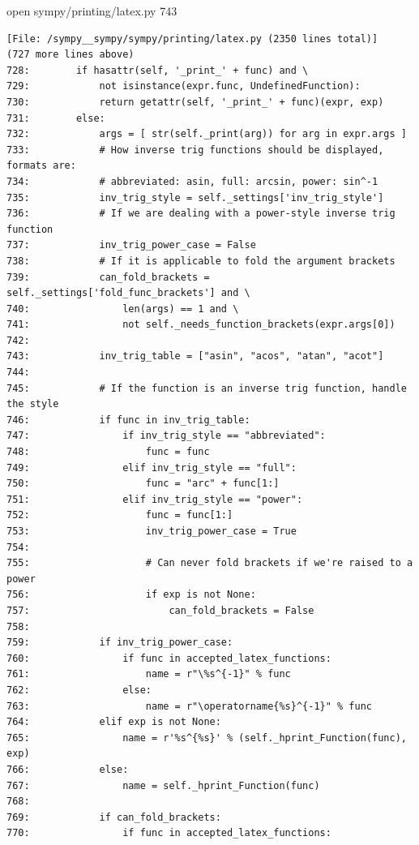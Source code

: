 {\begin{agentbox}
\hrulefill
\begin{CodeVerbatim}[breaklines=true, breakanywhere=true]
open sympy/printing/latex.py 743
\end{CodeVerbatim}
\end{agentbox}
\begin{observationbox}\begin{Verbatim}[breaklines=true, breakanywhere=true]
[File: /sympy__sympy/sympy/printing/latex.py (2350 lines total)]
(727 more lines above)
728:        if hasattr(self, '_print_' + func) and \
729:            not isinstance(expr.func, UndefinedFunction):
730:            return getattr(self, '_print_' + func)(expr, exp)
731:        else:
732:            args = [ str(self._print(arg)) for arg in expr.args ]
733:            # How inverse trig functions should be displayed, formats are:
734:            # abbreviated: asin, full: arcsin, power: sin^-1
735:            inv_trig_style = self._settings['inv_trig_style']
736:            # If we are dealing with a power-style inverse trig function
737:            inv_trig_power_case = False
738:            # If it is applicable to fold the argument brackets
739:            can_fold_brackets = self._settings['fold_func_brackets'] and \
740:                len(args) == 1 and \
741:                not self._needs_function_brackets(expr.args[0])
742:
743:            inv_trig_table = ["asin", "acos", "atan", "acot"]
744:
745:            # If the function is an inverse trig function, handle the style
746:            if func in inv_trig_table:
747:                if inv_trig_style == "abbreviated":
748:                    func = func
749:                elif inv_trig_style == "full":
750:                    func = "arc" + func[1:]
751:                elif inv_trig_style == "power":
752:                    func = func[1:]
753:                    inv_trig_power_case = True
754:
755:                    # Can never fold brackets if we're raised to a power
756:                    if exp is not None:
757:                        can_fold_brackets = False
758:
759:            if inv_trig_power_case:
760:                if func in accepted_latex_functions:
761:                    name = r"\%s^{-1}" % func
762:                else:
763:                    name = r"\operatorname{%s}^{-1}" % func
764:            elif exp is not None:
765:                name = r'%s^{%s}' % (self._hprint_Function(func), exp)
766:            else:
767:                name = self._hprint_Function(func)
768:
769:            if can_fold_brackets:
770:                if func in accepted_latex_functions:

\end{Verbatim}
\end{observationbox}}
